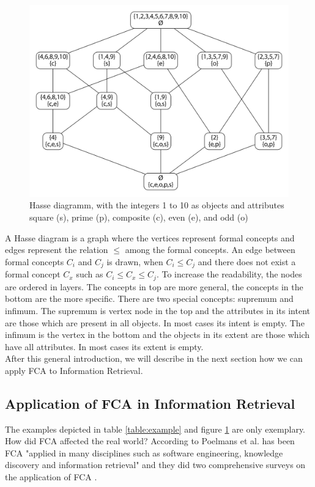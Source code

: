 \documentclass[11pt]{report}
\begin{document}
\begin{figure}[h]
\label{figure:example}
	\centering
	\includegraphics[width=\linewidth]{./images/fcaExample}
	\caption{Hasse diagramm, with the integers 1 to 10 as objects and attributes square (s), prime (p), composite (c), even (e), and odd (o)}
\end{figure}

A Hasse diagram is a graph where the vertices represent formal concepts and edges represent the relation $\le$ among the formal concepts. An edge between formal concepts $C_i$ and $C_j$ is drawn, when $C_i \le C_j$ and there does not exist a formal concept $C_x$ such as $C_i \le C_x \le C_j$. To increase the readability, the nodes are ordered in layers. The concepts in top are more general, the concepts in the bottom are the more specific. There are two special concepts: supremum and infimum. The supremum is vertex node in the top and the attributes in its intent are those which are present in all objects. In most cases its intent is empty. The infimum is the vertex in the bottom and the objects in its extent are those which have all attributes. In most cases its extent is empty.\\

After this general introduction, we will describe in the next section how we can apply FCA to Information Retrieval.

\subsection{Application of FCA in Information Retrieval}

The examples depicted in table \ref{table:example} and figure \ref{figure:example} are only exemplary. How did FCA affected the real world? According to Poelmans et al. has been FCA "applied in many disciplines such as software engineering, knowledge discovery and information retrieval" \cite{Poelmans2013} and they did two comprehensive surveys on the application of FCA \cite{Poelmans2013, Poelmans2013b}. \\
\end{document}
